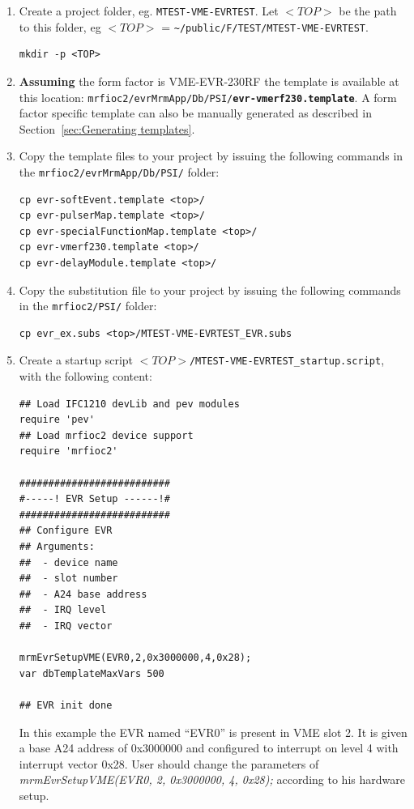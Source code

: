 \documentclass[12pt,a4paper]{article}
\begin{document}
\begin{enumerate}
\item
  Create a project folder, eg. \texttt{MTEST-VME-EVRTEST}. Let $ <TOP> $ be the path to this folder, eg $ <TOP> $ = \texttt{\textasciitilde/public/F/TEST/MTEST-VME-EVRTEST}.
\begin{verbatim}
mkdir -p <TOP>
\end{verbatim}
  
\item
  \textbf{Assuming} the form factor is VME-EVR-230RF the template is available at this location: \texttt{mrfioc2/evrMrmApp/Db/PSI/\textbf{evr-vmerf230.template}}. A form factor specific template can also be manually generated as described in Section~\ref{sec:Generating templates}.  

\item
  Copy the template files to your project by issuing the following commands in the \texttt{mrfioc2/evrMrmApp/Db/PSI/} folder:
\begin{verbatim}
cp evr-softEvent.template <top>/
cp evr-pulserMap.template <top>/
cp evr-specialFunctionMap.template <top>/
cp evr-vmerf230.template <top>/
cp evr-delayModule.template <top>/
\end{verbatim}

\item 
  Copy the substitution file to your project by issuing the following commands in the \texttt{mrfioc2/PSI/} folder:
\begin{verbatim}
cp evr_ex.subs <top>/MTEST-VME-EVRTEST_EVR.subs
\end{verbatim}

\item
  Create a startup script
  \texttt{$<TOP>$/MTEST-VME-EVRTEST\_startup.script}, with the following content:

\begin{verbatim}
## Load IFC1210 devLib and pev modules
require 'pev'
## Load mrfioc2 device support
require 'mrfioc2'

##########################
#-----! EVR Setup ------!#
##########################
## Configure EVR
## Arguments:
##  - device name
##  - slot number
##  - A24 base address
##  - IRQ level
##  - IRQ vector

mrmEvrSetupVME(EVR0,2,0x3000000,4,0x28);
var dbTemplateMaxVars 500

## EVR init done
\end{verbatim}

  In this example the EVR named ``EVR0'' is present in VME slot 2. It is
  given a base A24 address of 0x3000000 and configured to interrupt on
  level 4 with interrupt vector 0x28. User should change the parameters of \emph{mrmEvrSetupVME(EVR0, 2, 0x3000000, 4, 0x28);} according to his hardware setup.
  

\end{enumerate}
\end{document}

